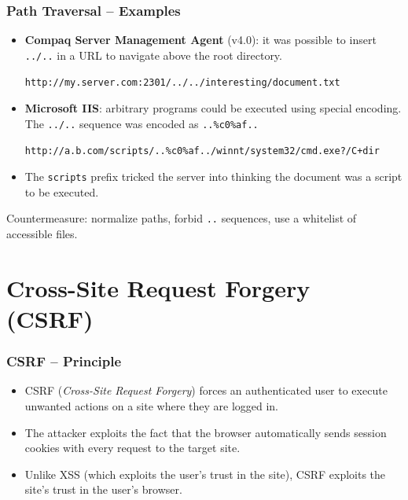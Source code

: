 \documentclass{beamer}
\def\emptyline{\vspace{10pt}}
\begin{document}
\begin{frame}
\frametitle{Path Traversal -- Examples}

\begin{itemize}
\item \textbf{Compaq Server Management Agent} (v4.0): it was possible to insert \texttt{../..} in a URL to navigate above the root directory.
\begin{center}\begin{scriptsize}
\texttt{http://my.server.com:2301/../../interesting/document.txt}
\end{scriptsize}\end{center}

\item \textbf{Microsoft IIS}: arbitrary programs could be executed using special encoding. The \texttt{../..} sequence was encoded as \texttt{..\%c0\%af..}
\begin{center}\begin{scriptsize}
\texttt{http://a.b.com/scripts/..\%c0\%af../winnt/system32/cmd.exe?/C+dir}
\end{scriptsize}\end{center}

\item The \texttt{scripts} prefix tricked the server into thinking the document was a script to be executed.
\end{itemize}

\emptyline
\alert{Countermeasure}: normalize paths, forbid \texttt{..} sequences, use a whitelist of accessible files.
\end{frame}


\section{Cross-Site Request Forgery (CSRF)}

\begin{frame}
\frametitle{CSRF -- Principle}

\begin{itemize}
\item CSRF (\textit{Cross-Site Request Forgery}) forces an authenticated user to \alert{execute unwanted actions} on a site where they are logged in.
\item The attacker exploits the fact that the browser automatically sends session cookies with every request to the target site.
\item Unlike XSS (which exploits the user's trust in the site), CSRF exploits the \alert{site's trust in the user's browser}.
\end{itemize}
\end{frame}
\end{document}
